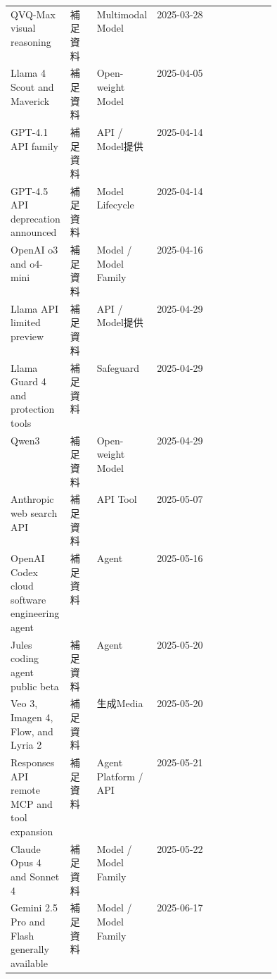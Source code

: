 \begin{center}
\begin{tabularx}{\linewidth}{@{}p{0.20\linewidth}p{0.10\linewidth}p{0.14\linewidth}X@{}}
QVQ-Max visual reasoning & 補足資料 & Multimodal Model & 2025-03-28 \\
Llama 4 Scout and Maverick & 補足資料 & Open-weight Model & 2025-04-05 \\
GPT-4.1 API family & 補足資料 & API / Model提供 & 2025-04-14 \\
GPT-4.5 API deprecation announced & 補足資料 & Model Lifecycle & 2025-04-14 \\
OpenAI o3 and o4-mini & 補足資料 & Model / Model Family & 2025-04-16 \\
Llama API limited preview & 補足資料 & API / Model提供 & 2025-04-29 \\
Llama Guard 4 and protection tools & 補足資料 & Safeguard & 2025-04-29 \\
Qwen3 & 補足資料 & Open-weight Model & 2025-04-29 \\
Anthropic web search API & 補足資料 & API Tool & 2025-05-07 \\
OpenAI Codex cloud software engineering agent & 補足資料 & Agent & 2025-05-16 \\
Jules coding agent public beta & 補足資料 & Agent & 2025-05-20 \\
Veo 3, Imagen 4, Flow, and Lyria 2 & 補足資料 & 生成Media & 2025-05-20 \\
Responses API remote MCP and tool expansion & 補足資料 & Agent Platform / API & 2025-05-21 \\
Claude Opus 4 and Sonnet 4 & 補足資料 & Model / Model Family & 2025-05-22 \\
Gemini 2.5 Pro and Flash generally available & 補足資料 & Model / Model Family & 2025-06-17 \\
\bottomrule
\end{tabularx}
\end{center}
\normalsize

